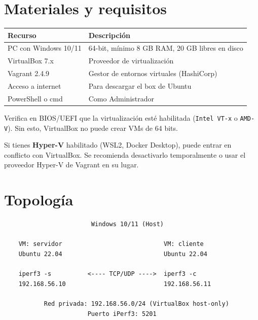 \documentclass[12pt]{article}
\begin{document}
\section{Materiales y requisitos}

\begin{center}
\begin{tabular}{|l|l|}
\hline
\textbf{Recurso} & \textbf{Descripción} \\
\hline
PC con Windows 10/11 & 64-bit, mínimo 8 GB RAM, 20 GB libres en disco \\
\hline
VirtualBox 7.x & Proveedor de virtualización \\
\hline
Vagrant 2.4.9 & Gestor de entornos virtuales (HashiCorp) \\
\hline
Acceso a internet & Para descargar el box de Ubuntu \\
\hline
PowerShell o cmd & Como Administrador \\
\hline
\end{tabular}
\end{center}

\begin{warning}
Verifica en BIOS/UEFI que la virtualización esté habilitada (\texttt{Intel VT-x} o \texttt{AMD-V}). Sin esto, VirtualBox no puede crear VMs de 64 bits.
\end{warning}

\begin{warning}
Si tienes \textbf{Hyper-V} habilitado (WSL2, Docker Desktop), puede entrar en conflicto con VirtualBox. Se recomienda desactivarlo temporalmente o usar el proveedor Hyper-V de Vagrant en su lugar.
\end{warning}

\section{Topología}

\begin{verbatim}
                        Windows 10/11 (Host)

    VM: servidor                            VM: cliente
    Ubuntu 22.04                            Ubuntu 22.04

    iperf3 -s          <---- TCP/UDP ---->  iperf3 -c
    192.168.56.10                           192.168.56.11

           Red privada: 192.168.56.0/24 (VirtualBox host-only)
                       Puerto iPerf3: 5201
\end{verbatim}
\end{document}
